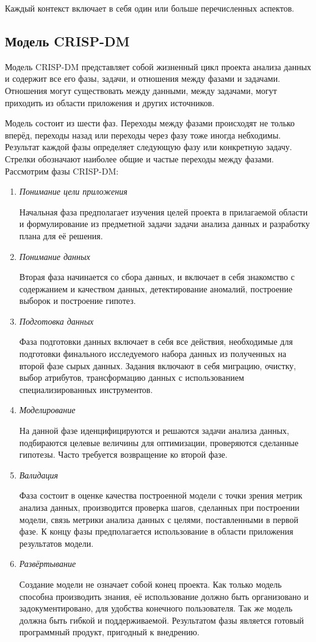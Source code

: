 Каждый контекст включает в себя один или больше перечисленных аспектов. 

\subsection{Модель CRISP-DM}
Модель CRISP-DM представляет собой жизненный цикл проекта анализа данных и содержит все его фазы, задачи, и отношения между фазами и задачами. Отношения могут существовать между данными, между задачами, могут приходить из области приложения и других источников. \cite{azevedo2008kdd}

Модель состоит из шести фаз. Переходы между фазами происходят не только вперёд, переходы назад или переходы через фазу тоже иногда небходимы. Результат каждой фазы определяет следующую фазу или конкретную задачу. Стрелки обозначают наиболее общие и частые переходы между фазами. Рассмотрим фазы CRISP-DM:
\begin{enumerate}
	\item \textit{Понимание цели приложения}

	Начальная фаза предполагает изучения целей проекта в прилагаемой области и формулирование из предметной задачи задачи анализа данных и разработку плана для её решения.
	\item \textit{Понимание данных}

	Вторая фаза начинается со сбора данных, и включает в себя знакомство с содержанием и качеством данных, детектирование аномалий, построение выборок и построение гипотез.
	\item \textit{Подготовка данных}

	Фаза подготовки данных включает в себя все действия, необходимые для подготовки финального исследуемого набора данных из полученных на второй фазе сырых данных. Задания включают в себя миграцию, очистку, выбор атрибутов, трансформацию данных с использованием специализированных инструментов.
	\item \textit{Моделирование}

	На данной фазе иденцифицируются и решаются задачи анализа данных, подбираются целевые величины для оптимизации, проверяются сделанные гипотезы. Часто требуется возвращение ко второй фазе.
	\item \textit{Валидация}

	Фаза состоит в оценке качества построенной модели с точки зрения метрик анализа данных, производится проверка шагов, сделанных при построении модели, связь метрики анализа данных с целями, поставленными в первой фазе. К концу фазы предполагается использование в области приложения результатов модели.
	\item \textit{Развёртывание}

	Создание модели не означает собой конец проекта. Как только модель способна производить знания, её использование должно быть организовано и задокументировано, для удобства конечного пользователя. Так же модель должна быть гибкой и поддерживаемой. Результатом фазы является готовый программный продукт, пригодный к внедрению.
\end{enumerate}  
